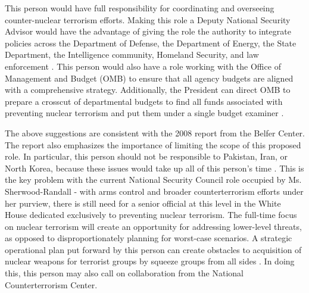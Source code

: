 \documentclass{report}
\begin{document}
This person would have full responsibility for coordinating and overseeing counter-nuclear terrorism efforts. Making this role a Deputy National Security Advisor would have the advantage of giving the role the authority to integrate policies across the Department of Defense, the Department of Energy, the State Department, the Intelligence community, Homeland Security, and law enforcement \cite{Bronner2008}. This person would also have a role working with the Office of Management and Budget (OMB) to ensure that all agency budgets are aligned with a comprehensive strategy. Additionally, the President can direct OMB to prepare a crosscut of departmental budgets to find all funds associated with preventing nuclear terrorism and put them under a single budget examiner \cite{Bronner2008}.

The above suggestions are consistent with the 2008 report from the Belfer Center. The report also emphasizes the importance of limiting the scope of this proposed role. In particular, this person should not be responsible to Pakistan, Iran, or North Korea, because these issues would take up all of this person's time \cite{Sharp2008}. This is the key problem with the current National Security Council role occupied by Ms. Sherwood-Randall - with arms control and broader counterterrorism efforts under her purview, there is still need for a senior official at this level in the White House dedicated exclusively to preventing nuclear terrorism. The full-time focus on nuclear terrorism will create an opportunity for addressing lower-level threats, as opposed to disproportionately planning for worst-case scenarios. A strategic operational plan put forward by this person can create obstacles to acquisition of nuclear weapons for terrorist groups by squeeze groups from all sides \cite{Levi2008,Ferguson2006}.  In doing this, this person may also call on collaboration from the National Counterterrorism Center.
\end{document}

